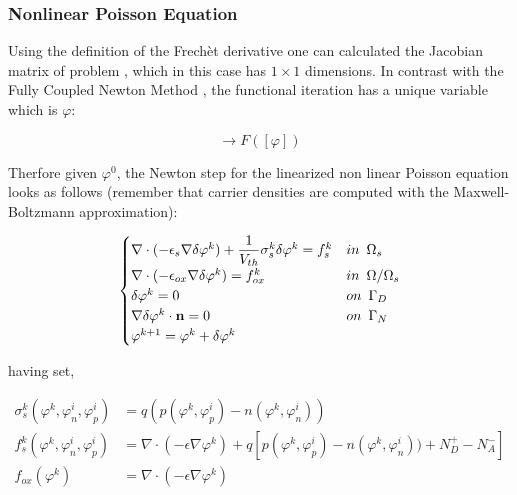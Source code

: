 \subsubsection{Nonlinear Poisson Equation}

Using the definition of the Frech\`et derivative one can calculated the Jacobian matrix of problem , which in this case has $1\times 1$ dimensions. In contrast with the Fully Coupled Newton Method , the functional iteration has a unique variable which is $\varphi$:

\begin{equation}
[\varphi] \rightarrow F([\varphi])
\end{equation}

Therfore given $\varphi^0$, the Newton step for the linearized non linear Poisson equation looks as follows (remember that carrier densities are computed with the Maxwell-Boltzmann approximation):

\begin{equation}
\label{eq: newton step NLP}
\begin{cases}

\nabla \cdot (-\epsilon_s \nabla \delta\varphi^k) 
+   \dfrac{1}{V_{th}} \sigma_s^k\delta\varphi^k 
 =  f_s^k & in \psp{3} \Omega_s
  \\
\nabla \cdot (-\epsilon_{ox} \nabla \delta\varphi^k) =  f_{ox}^k & in \psp{3} \Omega / \Omega_s 
\\
\delta \varphi^k = 0 & on \psp{3} \Gamma_D 
\\
\nabla \delta \varphi^k \cdot \vect{n} = 0 & on \psp{3} \Gamma_N
\\
\varphi^{k+1}=\varphi^k+\delta \varphi^k
\end{cases} 
\end{equation}

having set,

\begin{align*}
\sigma_s^k(\varphi^{k},\varphi_n^{i},\varphi_p^{i}) & =q(p(\varphi^k,\varphi_p^i)-n(\varphi^k,\varphi_n^i))
\\
f_s^k(\varphi^k,\varphi_n^i,\varphi_p^i) & = \nabla \cdot (-\epsilon \nabla \varphi^k) + q\left[ p(\varphi^k,\varphi_p^i)-n(\varphi^k,\varphi_n^i)) + N_D^+-N_A^- \right]
\\
f_{ox}(\varphi^k) & = \nabla \cdot (-\epsilon \nabla \varphi^k) 
\end{align*}

